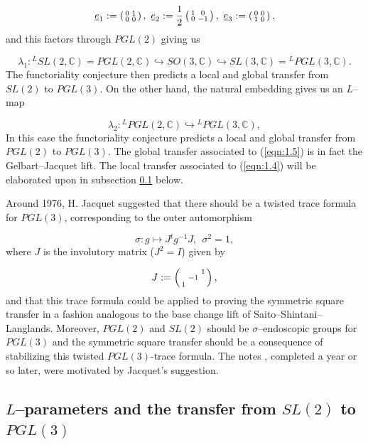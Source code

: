 \documentclass[12pt,letterpaper]{amsart}
\numberwithin{equation}{section}
\theoremstyle{definition}
\theoremstyle{plain}
\def\ccc{\mathbb{C}}
\begin{document}
\[
\underline{e}_1 := \left(\smallmatrix 0&1 \\ 0&0 \endsmallmatrix\right),
\ \underline{e}_2 := \frac12\left(\smallmatrix 1&0 \\ 0&-1 \endsmallmatrix\right),
\ \underline{e}_3 := \left(\smallmatrix 0&0 \\ 1&0 \endsmallmatrix\right),
\]
and this factors through $PGL(2)$ giving us

\begin{equation}
\label{eqn:1.4}
\lambda_1 :  {^{L}SL(2,\ccc )} =PGL(2,\ccc )
\hookrightarrow SO(3,\ccc ) 
\hookrightarrow  SL(3,\ccc ) = {^{L}PGL(3,\ccc )} .
\end{equation}
The functoriality conjecture then predicts a local and global transfer
from $SL(2)$ to $PGL(3)$. On the other hand, the natural embedding gives us
an $L$--map

\begin{equation}
\label{eqn:1.5}
\lambda_2 : {^{L}PGL(2,\ccc )} \hookrightarrow {^{L}PGL(3,\ccc )},
\end{equation}
In this case the functoriality conjecture predicts a local and global
transfer from $PGL(2)$ to $PGL(3)$. The global transfer associated to 
(\ref{eqn:1.5}) 
is in fact the Gelbart--Jacquet lift. The local transfer associated to
(\ref{eqn:1.4}) will be elaborated upon in subsection 
\ref{sec:1.2} below.
 
Around 1976, H. Jacquet suggested that there should be a twisted trace
formula for $PGL(3)$, corresponding to the outer automorphism

\[
\sigma : g \longmapsto J{^{t}g^{-1}}J,\ \ \sigma^2 = 1,
\]
where $J$ is the involutory matrix ($J^2=I$) given by

\[
J:= \left(\smallmatrix \ &\ &1\\
\ &-1&\ \\
1&\ &\ \endsmallmatrix\right),
\]
and that this trace formula could be applied to proving the symmetric square 
transfer in a fashion analogous to the base change lift of 
Saito--Shintani--Langlands.  Moreover,
$PGL(2)$ and $SL(2)$ should be $\sigma$--endoscopic groups for $PGL(3)$ and the
symmetric square transfer should be a consequence of stabilizing this twisted
$PGL(3)$-trace formula. The notes \cite{LaUn}, completed a year or so later,
were motivated by Jacquet's suggestion.

\subsection{$L$--parameters and the transfer from $SL(2)$ to $PGL(3)$}
\label{sec:1.2}
\end{document}
